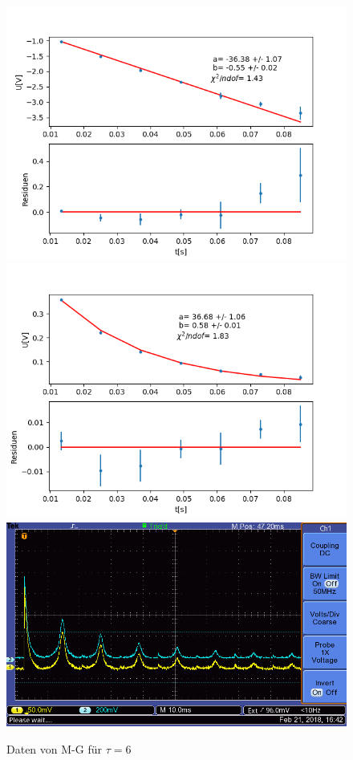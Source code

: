 \documentclass[12pt,a4paper]{article}
\begin{document}
\begin{figure}
\centering
\includegraphics[scale=0.5]{Bilder/T2Anhang/T2log6.png}
\includegraphics[scale=0.5]{Bilder/T2Anhang/T2exp6.png}
\includegraphics[scale=0.5]{Bilder/T2Anhang/T2plot6.png}
\caption{Daten von M-G für $\tau = 6$}
\end{figure}
\end{document}
